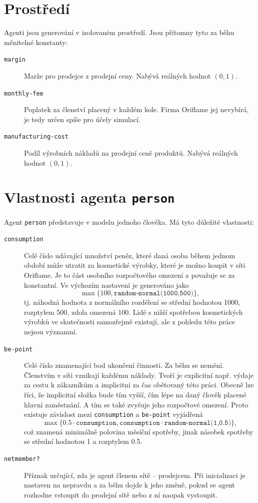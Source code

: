 \documentclass[a4wide,12pt]{report}
\begin{document}
\section{Prostředí}
Agenti jsou generování v izolovaném prostředí. Jsou přítomny tyto za běhu měnitelné konstanty:
\begin{description}
\item[\texttt{margin}] Marže pro prodejce z prodejní ceny. Nabývá reálných hodnot $(0,1)$.
\item[\texttt{monthly-fee}] Poplatek za členství placený v každém kole. Firma Oriflame jej nevybírá, je tedy určen spíše pro účely simulací.
\item[\texttt{manufacturing-cost}] Podíl výrobních nákladů na prodejní ceně produktů. Nabývá reálných hodnot $(0,1)$.
\end{description}
\section{Vlastnosti agenta \texttt{person}}
\label{sec:vl_agenta}
Agent \texttt{person} představuje v modelu jednoho člověka. Má tyto důležité vlastnosti:
\begin{description}
\item[\texttt{consumption}] Celé číslo udávající množství peněz, které daná osoba během jednom období může utratit za kosmetické výrobky, které je možno koupit v síti Oriflame. Je to část osobního rozpočtového omezení a považuje se za konstantní. Ve výchozím nastavení je generováno jako
$$\max\{100,\texttt{random-normal(1000,500)}\},$$
tj. náhodná hodnota z normálního rozdělení se střední hodnotou 1000, rozptylem 500, zdola omezená 100. Lidé s nižší spotřebou kosmetických výrobků ve skutečnosti samozřejmě existují, ale z pohledu této práce nejsou významní.
\item[\texttt{be-point}] Celé číslo znamenající bod ukončení činnosti. Za běhu se nemění. Členstvím v síti vznikají každému náklady. Tvoří je explicitní např. výdaje za cestu k zákazníkům a implicitní za čas obětovaný této práci. Obecně lze říci, že implicitní složka bude tím vyš\-ší, čím lépe na daný člověk placené hlavní zaměstnání. A tím se také zvyšuje jeho rozpočtové omezení. Proto existuje závislost mezi \texttt{consumption} a \texttt{be-point} vyjádřená
$$\max\{0.5\cdot\texttt{consumption},\texttt{consumption}\cdot\texttt{random-normal(1,0.5)}\},$$
což znamená minimálně polovina měsíční spotřeby, jinak násobek spotřeby se střední hodnotou 1 a rozptylem 0.5.
\item[\texttt{netmember?}] Příznak určující, zda je agent členem sítě -- prodejcem. Při inicializaci je nastaven na nepravdu a za běhu dojde k jeho změně, pokud se agent rozhodne vstoupit do prodejní sítě nebo z ní naopak vystoupit.
\end{description}
\end{document}
